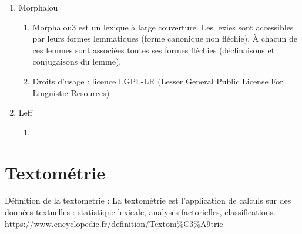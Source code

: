 \documentclass{book}
\begin{document}
\begin{enumerate}
    \item Morphalou
        \begin{enumerate}
            \item Morphalou3 est un lexique à large couverture. Les lexies sont accessibles par leurs formes lemmatiques (forme canonique non fléchie). À chacun de ces lemmes sont associées toutes ses formes fléchies (déclinaisons et conjugaisons du lemme).
            \item Droits d'usage : licence LGPL-LR (Lesser General Public License For Linguistic Resources)
        \end{enumerate}
    \item Leff
        \begin{enumerate}
            \item 
        \end{enumerate}
\end{enumerate}

\section{Textométrie}%

Définition de la textometrie : La textométrie est l’application de calculs sur des données textuelles : statistique lexicale, analyses factorielles, classifications.\url{ https://www.encyclopedie.fr/definition/Textom%C3%A9trie}
\end{document}

